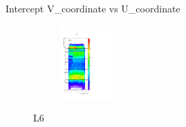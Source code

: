 \documentclass[xcolor=dvipsnames]{beamer}
\begin{document}
\begin{frame}{Intercept V\_coordinate vs U\_coordinate}
\begin{multicols}{4}
\begin{figure}[H]
 			\begin{center}				
 				\begin{subfigure}[b]{0.30\textwidth}
 					\includegraphics[width=2cm]{L6_bhabha.pdf}
 				\end{subfigure}		
 				\caption*{L6}		
 			\end{center}
 		\end{figure}
 	\end{multicols}	
 	
 \end{frame}
 
\end{document}
